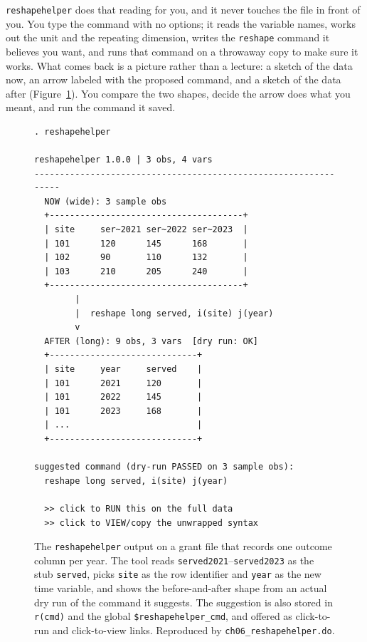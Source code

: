 \documentclass[
    a4paper,
    fontsize=10pt,
    twoside=true,
    numbers=noenddot,
]{kaobook}
\begin{document}
\texttt{reshapehelper} does that reading for you, and it never touches the file in front of you. You type the command with no options; it reads the variable names, works out the unit and the repeating dimension, writes the \texttt{reshape} command it believes you want, and runs that command on a throwaway copy to make sure it works. What comes back is a picture rather than a lecture: a sketch of the data now, an arrow labeled with the proposed command, and a sketch of the data after (Figure~\ref{fig:reshapehelper}). You compare the two shapes, decide the arrow does what you meant, and run the command it saved.

\begin{figure}[htbp]
\centering
{\footnotesize
\begin{mdframed}[backgroundcolor=aeBg,linecolor=aeRule,linewidth=0.6pt,%
roundcorner=3pt,innertopmargin=5pt,innerbottommargin=5pt,%
innerleftmargin=7pt,innerrightmargin=7pt,nobreak=true]
\begin{verbatim}
. reshapehelper

reshapehelper 1.0.0 | 3 obs, 4 vars
----------------------------------------------------------------
  NOW (wide): 3 sample obs
  +--------------------------------------+
  | site     ser~2021 ser~2022 ser~2023  |
  | 101      120      145      168       |
  | 102      90       110      132       |
  | 103      210      205      240       |
  +--------------------------------------+
        |
        |  reshape long served, i(site) j(year)
        v
  AFTER (long): 9 obs, 3 vars  [dry run: OK]
  +-----------------------------+
  | site     year     served    |
  | 101      2021     120       |
  | 101      2022     145       |
  | 101      2023     168       |
  | ...                         |
  +-----------------------------+

suggested command (dry-run PASSED on 3 sample obs):
  reshape long served, i(site) j(year)

  >> click to RUN this on the full data
  >> click to VIEW/copy the unwrapped syntax
\end{verbatim}
\end{mdframed}
}
\caption[The reshapehelper diagnosis and suggestion]{The \texttt{reshapehelper} output on a grant file that records one outcome column per year. The tool reads \texttt{served2021}--\texttt{served2023} as the stub \texttt{served}, picks \texttt{site} as the row identifier and \texttt{year} as the new time variable, and shows the before-and-after shape from an actual dry run of the command it suggests. The suggestion is also stored in \texttt{r(cmd)} and the global \texttt{\$reshapehelper\_cmd}, and offered as click-to-run and click-to-view links. Reproduced by \texttt{ch06\_reshapehelper.do}.}
\label{fig:reshapehelper}
\end{figure}
\end{document}
